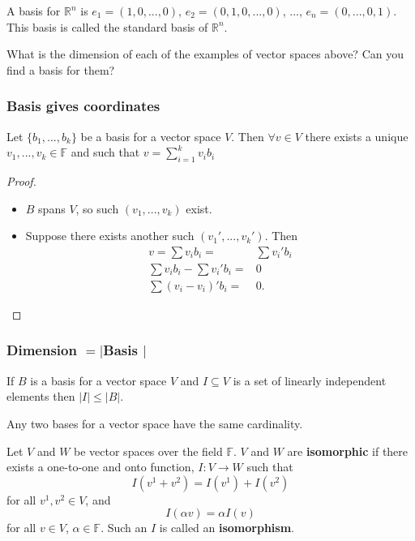 \documentclass[compress]{beamer}
\def\F{\mathbb{F}}
\def\R{\mathbb{R}}
\theoremstyle{definition}
\begin{document}
\begin{frame}
  \begin{example}
    A basis for $\R^n$ is $e_1 = (1, 0, ..., 0 )$, $e_2 = (0, 1, 0, ...,
    0)$, $...$, $e_n = (0, ... , 0 , 1)$. This basis is called the
    standard basis of $\R^n$. 
  \end{example}

  \begin{example} 
    What is the dimension of each of the examples of vector spaces
    above? Can you find a basis for them? 
  \end{example}
\end{frame}

\begin{frame}\frametitle{Basis gives coordinates}
  \begin{lemma}
    Let $\{b_1, ..., b_k\}$ be a basis for a vector space $V$. Then
    $\forall v \in V$ there exists a unique $v_1, ..., v_k \in \F$ and
    such that $ v = \sum_{i=1}^k v_i b_i$  
  \end{lemma}
  \begin{proof}
    \begin{itemize}
    \item $B$ spans $V$, so such $(v_1, ..., v_k)$ exist. 
    \item Suppose there exists another such $(v_1', ..., v_k')$. Then
      \begin{align*}
        v = \sum v_i b_i = & \sum v_i' b_i \\
        \sum v_i b_i - \sum v_i'b_i = & 0 \\
        \sum (v_i - v_i)' b_i = & 0.
      \end{align*}
    \end{itemize}
  \end{proof}
\end{frame}

\begin{frame}\frametitle{Dimension $ = |$Basis $|$}
   \begin{lemma}
    If $B$ is a basis for a vector space $V$ and $I \subseteq V$ is a
    set of linearly independent elements then $|I| \leq |B|$. 
  \end{lemma}

  \begin{corollary}
    Any two bases for a vector space have the same cardinality.
  \end{corollary}
\end{frame}

\begin{frame}
  \begin{definition}
    Let $V$ and $W$ be vector spaces over the field $\F$. $V$ and $W$ are
    \textbf{isomorphic} if there exists a one-to-one and onto function,
    $I:V \to W$ such that 
    \[ I(v^1 + v^2) = I(v^1) + I(v^2) \]
    for all $v^1, v^2 \in V$,
    and 
    \[ I(\alpha v) = \alpha I(v) \]
    for all $v \in V$, $\alpha \in \F$.
    Such an $I$ is called an \textbf{isomorphism}.
  \end{definition}
\end{frame}
\end{document}
